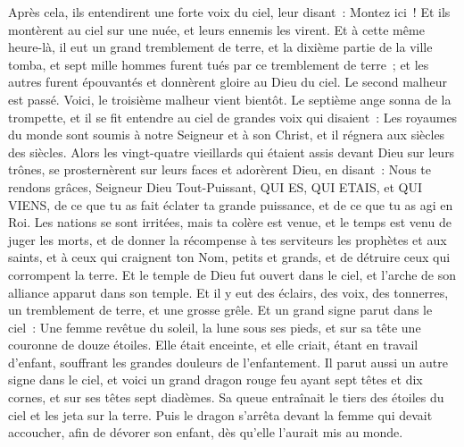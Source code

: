 \begin{multicols}{2}
Après cela, ils entendirent une forte voix du ciel, leur disant~: Montez ici~! Et ils montèrent au ciel sur une nuée, et leurs ennemis les virent.
Et à cette même heure-là, il eut un grand tremblement de terre, et la dixième partie de la ville tomba, et sept mille hommes furent tués par ce tremblement de terre~; et les autres furent épouvantés et donnèrent gloire au Dieu du ciel.
Le second malheur est passé. Voici, le troisième malheur vient bientôt.
Le septième ange sonna de la trompette, et il se fit entendre au ciel de grandes voix qui disaient~: Les royaumes du monde sont soumis à notre Seigneur et à son Christ, et il régnera aux siècles des siècles.
Alors les vingt-quatre vieillards qui étaient assis devant Dieu sur leurs trônes, se prosternèrent sur leurs faces et adorèrent Dieu,
en disant~: Nous te rendons grâces, Seigneur Dieu Tout-Puissant, QUI ES, QUI ETAIS, et QUI VIENS, de ce que tu as fait éclater ta grande puissance, et de ce que tu as agi en Roi.
Les nations se sont irritées, mais ta colère est venue, et le temps est venu de juger les morts, et de donner la récompense à tes serviteurs les prophètes et aux saints, et à ceux qui craignent ton Nom, petits et grands, et de détruire ceux qui corrompent la terre.
Et le temple de Dieu fut ouvert dans le ciel, et l'arche de son alliance apparut dans son temple. Et il y eut des éclairs, des voix, des tonnerres, un tremblement de terre, et une grosse grêle.
\VerseOne{}Et un grand signe parut dans le ciel~: Une femme revêtue du soleil, la lune sous ses pieds, et sur sa tête une couronne de douze étoiles.
Elle était enceinte, et elle criait, étant en travail d'enfant, souffrant les grandes douleurs de l'enfantement.
Il parut aussi un autre signe dans le ciel, et voici un grand dragon rouge feu ayant sept têtes et dix cornes, et sur ses têtes sept diadèmes.
Sa queue entraînait le tiers des étoiles du ciel et les jeta sur la terre. Puis le dragon s'arrêta devant la femme qui devait accoucher, afin de dévorer son enfant, dès qu'elle l'aurait mis au monde.

\end{multicols}
